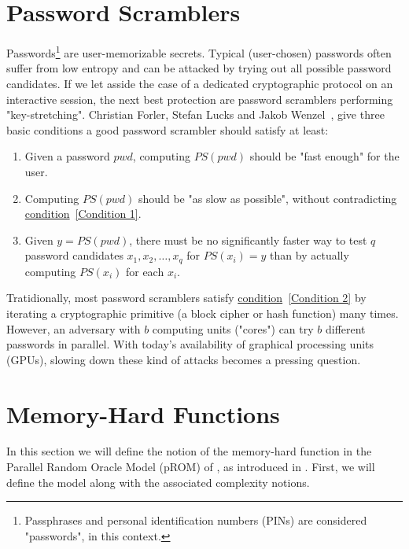 \section{Password Scramblers}
Passwords\footnote{Passphrases and personal identification numbers (PINs) are considered "passwords", in this context.} are user-memorizable secrets. Typical (user-chosen) passwords often suffer from low entropy and can be attacked by trying out all possible password candidates. If we let asside the case of a dedicated cryptographic protocol on an interactive session, the next best protection are password scramblers performing "key-stretching". Christian Forler, Stefan Lucks and Jakob Wenzel~\cite{ForlerLW13}, give three basic conditions a good password scrambler should satisfy at least:

\begin{enumerate}
  \item \label{Condition 1} Given a password $pwd$, computing $PS(pwd)$ should be "fast enough" for the user.
  \item \label{Condition 2} Computing $PS(pwd)$ should be "as slow as possible", without contradicting \hyperref[Condition 1]{condition}~\ref{Condition 1}.
  \item Given $y=PS(pwd)$, there must be no significantly faster way to test $q$ password candidates $x_1, x_2, \dots, x_q$ for $PS(x_i)=y$ than by actually computing $PS(x_i)$ for each $x_i$.
\end{enumerate}
Tratidionally, most password scramblers satisfy \hyperref[Condition 2]{condition}~\ref{Condition 2} by iterating a cryptographic primitive (a block cipher or hash function) many times. However, an adversary with $b$ computing units ("cores") can try $b$ different passwords in parallel. With today's availability of graphical processing units (GPUs), slowing down these kind of attacks becomes a pressing question.
%
\section{Memory-Hard Functions} \label{sec:memory-hard}
In this section we will define the notion of the memory-hard function in the Parallel Random Oracle Model (pROM) of \cite{Alwen:2015:HPC:2746539.2746622}, as introduced in \cite{cryptoeprint:2016:875}. First, we will define the model along with the associated complexity notions.


